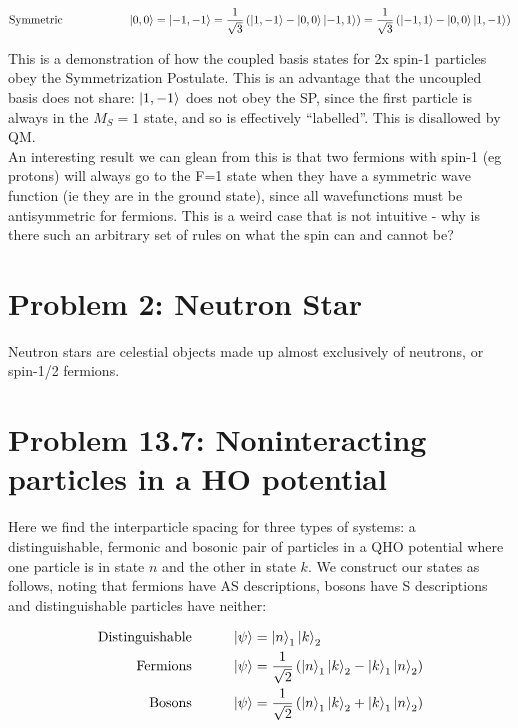 \documentclass[10pt]{article} %
\begin{document}
\begin{align*}
  \mbox{Symmetric}\hspace{2cm} &\ket{0,0} = \ket{-1,-1} =
  \frac{1}{\sqrt{3}}\left(\ket{1,-1} - \ket{0,0} \ket{-1,1}\right)
  = \frac{1}{\sqrt{3}}\left(\ket{-1,1} - \ket{0,0} \ket{1,-1}\right)\\
\end{align*}

This is a demonstration of how the coupled basis states for 2x spin-1 particles
obey the Symmetrization Postulate. This is an advantage that the uncoupled basis
does not share: $\ket{1,-1}$ does not obey the SP, since the first particle is always
in the $M_S = 1$ state, and so is effectively ``labelled''. This is disallowed
by QM.\\

An interesting result we can glean from this is that two fermions with
spin-1 (eg protons) will always go to the F=1 state when they have a symmetric
wave function (ie they are in the ground state), since all wavefunctions must be
antisymmetric for fermions. This is a weird case that is not intuitive - why is
there such an arbitrary set of rules on what the spin can and cannot be?\\

\section{Problem 2: Neutron Star}
Neutron stars are celestial objects made up almost exclusively of neutrons, or spin-1/2 fermions.\\

\section{Problem 13.7: Noninteracting particles in a HO potential}
Here we find the interparticle spacing for three types of systems: a distinguishable,
fermonic and bosonic pair of particles in a QHO potential where one particle is in state $n$
and the other in state $k$. We construct our states as follows, noting that fermions have AS
descriptions, bosons have S descriptions and distinguishable particles have neither:

\begin{align*}
  \mbox{Distinguishable}&\hspace{1cm} \ket{\psi} = \ket{n}_1\ket{k}_2\\
  \mbox{Fermions}&\hspace{1cm} \ket{\psi}
  = \frac{1}{\sqrt{2}}\left(\ket{n}_1\ket{k}_2 - \ket{k}_1\ket{n}_2\right)\\
  \mbox{Bosons}&\hspace{1cm} \ket{\psi}
  = \frac{1}{\sqrt{2}}\left(\ket{n}_1\ket{k}_2 + \ket{k}_1\ket{n}_2\right)\\
\end{align*}
\end{document}
